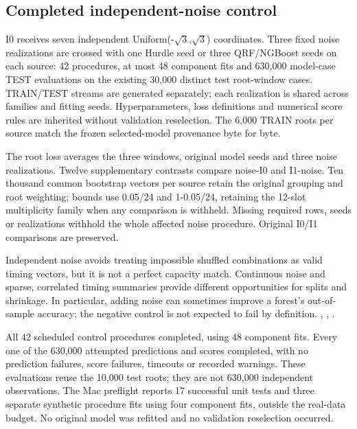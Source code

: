 \hypertarget{completed-independent-noise-control}{%
\subsection{Completed independent-noise control}\label{completed-independent-noise-control}}

I0 receives seven independent Uniform(-\(\sqrt{3}\),\(\sqrt{3}\)) coordinates. Three fixed noise realizations are crossed with one Hurdle seed or three QRF/NGBoost seeds on each source: 42 procedures, at most 48 component fits and 630,000 model-case TEST evaluations on the existing 30,000 distinct test root-window cases. TRAIN/TEST streams are generated separately; each realization is shared across families and fitting seeds. Hyperparameters, loss definitions and numerical score rules are inherited without validation reselection. The 6,000 TRAIN roots per source match the frozen selected-model provenance byte for byte.

The root loss averages the three windows, original model seeds and three noise realizations. Twelve supplementary contrasts compare noise-I0 and I1-noise. Ten thousand common bootstrap vectors per source retain the original grouping and root weighting; bounds use 0.05/24 and 1-0.05/24, retaining the 12-slot multiplicity family when any comparison is withheld. Missing required rows, seeds or realizations withhold the whole affected noise procedure. Original I0/I1 comparisons are preserved.

Independent noise avoids treating impossible shuffled combinations as valid timing vectors, but it is not a perfect capacity match. Continuous noise and sparse, correlated timing summaries provide different opportunities for splits and shrinkage. In particular, adding noise can sometimes improve a forest's out-of-sample accuracy; the negative control is not expected to fail by definition. \cite{strobl2007}, \cite{hooker2021}, \cite{mentch2022}.

All 42 scheduled control procedures completed, using 48 component fits. Every one of the 630,000 attempted predictions and scores completed, with no prediction failures, score failures, timeouts or recorded warnings. These evaluations reuse the 10,000 test roots; they are not 630,000 independent observations. The Mac preflight reports 17 successful unit tests and three separate synthetic procedure fits using four component fits, outside the real-data budget. No original model was refitted and no validation reselection occurred.

